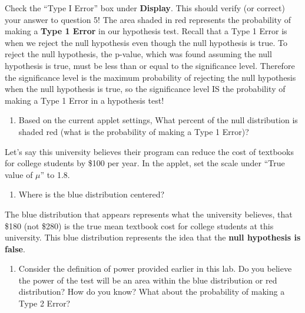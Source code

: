 \documentclass[
]{report}
\providecommand{\tightlist}{%
  \setlength{\itemsep}{0pt}\setlength{\parskip}{0pt}}
\begin{document}
Check the ``Type I Error'' box under \textbf{Display}. This should verify (or correct) your answer to question 5! The area shaded in red represents the probability of making a \textbf{Type 1 Error} in our hypothesis test. Recall that a Type 1 Error is when we reject the null hypothesis even though the null hypothesis is true. To reject the null hypothesis, the p-value, which was found assuming the null hypothesis is true, must be less than or equal to the significance level. Therefore the significance level is the maximum probability of rejecting the null hypothesis when the null hypothesis is true, so the significance level IS the probability of making a Type 1 Error in a hypothesis test!

\begin{enumerate}
\def\labelenumi{\arabic{enumi}.}
\setcounter{enumi}{5}
\tightlist
\item
  Based on the current applet settings, What percent of the null distribution is shaded red (what is the probability of making a Type 1 Error)?
  \vspace{0.25in}
\end{enumerate}

Let's say this university believes their program can reduce the cost of textbooks for college students by \$100 per year. In the applet, set the scale under ``True value of \(\mu\)'' to 1.8.

\begin{enumerate}
\def\labelenumi{\arabic{enumi}.}
\setcounter{enumi}{6}
\tightlist
\item
  Where is the blue distribution centered?
  \vspace{0.25in}
\end{enumerate}

The blue distribution that appears represents what the university believes, that \$180 (not \$280) is the true mean textbook cost for college students at this university. This blue distribution represents the idea that the \textbf{null hypothesis is false}.

\begin{enumerate}
\def\labelenumi{\arabic{enumi}.}
\setcounter{enumi}{7}
\tightlist
\item
  Consider the definition of power provided earlier in this lab. Do you believe the power of the test will be an area within the blue distribution or red distribution? How do you know? What about the probability of making a Type 2 Error?
  \vspace{1in}
\end{enumerate}
\end{document}
